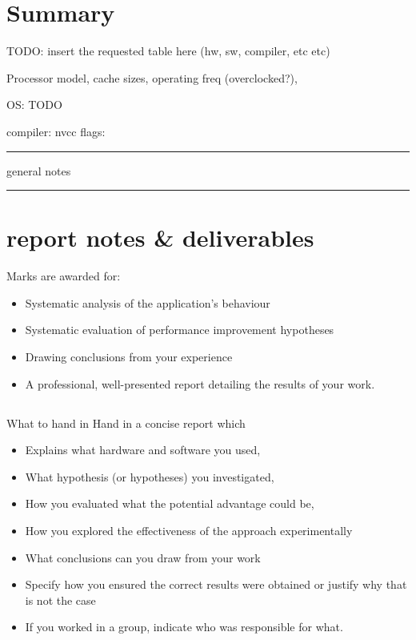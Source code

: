 \documentclass[11pt, oneside, a4paper]{article}
\begin{document}
\section{Summary} %
\label{sec:summary}

TODO: insert the requested table here (hw, sw, compiler, etc etc)


Processor
model, cache sizes, operating freq (overclocked?), 

OS: TODO


compiler: nvcc
flags: 





\hspace{1em}
\hrule
general notes
\hspace{1em}
\hrule

\section{report notes \& deliverables} %
\label{sec:report_notes_on_deliverables}

Marks are awarded for:
\begin{itemize}
\item  Systematic analysis of the application's behaviour
\item  Systematic evaluation of performance improvement hypotheses
\item  Drawing conclusions from your experience
\item  A professional, well-presented report detailing the results of your work.
\end{itemize}

\subsection{} %
\label{sub:}


What to hand in Hand in a concise report which
\begin{itemize}
\item  Explains what hardware and software you used,
\item  What hypothesis (or hypotheses) you investigated,
\item  How you evaluated what the potential advantage could be,
\item  How you explored the effectiveness of the approach experimentally
\item  What conclusions can you draw from your work
\item  Specify how you ensured the correct results were obtained or justify why that is not the case
\item  If you worked in a group, indicate who was responsible for what.
\end{itemize}
\end{document}
